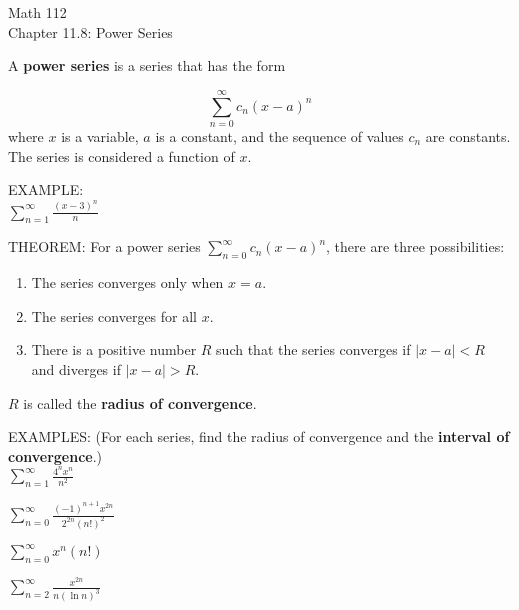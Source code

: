 \documentclass[11pt]{article}
\begin{document}
\begin{center}
\Large
\rm{Math 112}
\\
\rm{Chapter 11.8:  Power Series}
\\
\end{center}
\vspace{0.2in}

A {\bf power series} is a series that has the form

  \begin{displaymath}
\sum_{n=0}^{\infty}c_n(x-a)^n
  \end{displaymath}
  where $x$ is a variable, $a$ is a constant, and the sequence of values $c_n$ are constants.  The series is considered a function of $x$.
  \vspace{0.3in}

 EXAMPLE:\\

 $\sum_{n=1}^{\infty} \frac{(x-3)^n}{n}$

 \vspace{3in}

 THEOREM:  For a power series  $\sum_{n=0}^{\infty}c_n(x-a)^n$, there are three possibilities:

 \begin{enumerate}
 \item{The series converges only when $x=a$.}
 \item{The series converges for all $x$.}
 \item{There is a positive number $R$ such that the series converges if $|x-a|<R$ and diverges if $|x-a|>R$.}
 \end{enumerate}

 $R$ is called the {\bf radius of convergence}.
 

 \pagebreak

 EXAMPLES:  (For each series, find the radius of convergence and the {\bf interval of convergence}.)\\

 

 
 $\sum_{n=1}^{\infty} \frac{4^nx^n}{n^2}$

 \vspace{2.8in}

 $\sum_{n=0}^{\infty} \frac{(-1)^{n+1}x^{2n}}{2^{2n}(n!)^2}$


 \vspace{3.1in}

 $\sum_{n=0}^{\infty} x^n(n!)$
 
 \pagebreak

 $\sum_{n=2}^{\infty} \frac{x^{2n}}{n(\ln{n})^3}$
 
\end{document}
